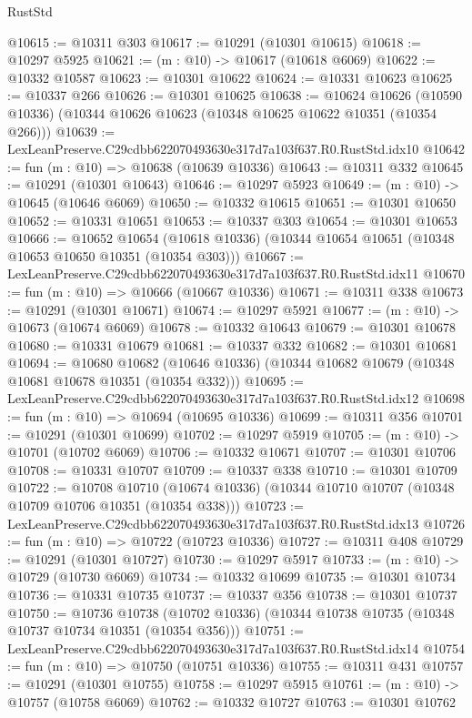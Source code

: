 \begin{lexlean}{RustStd}
\begin{coremodule}
@10615 := @10311 @303
@10617 := @10291 (@10301 @10615)
@10618 := @10297 @5925
@10621 := (m : @10) -> @10617 (@10618 @6069)
@10622 := @10332 @10587
@10623 := @10301 @10622
@10624 := @10331 @10623
@10625 := @10337 @266
@10626 := @10301 @10625
@10638 := @10624
    @10626
    (@10590 @10336)
    (@10344 @10626 @10623 (@10348 @10625 @10622 @10351 (@10354 @266)))
@10639 := LexLeanPreserve.C29cdbb622070493630e317d7a103f637.R0.RustStd.idx10
@10642 := fun (m : @10) => @10638 (@10639 @10336)
@10643 := @10311 @332
@10645 := @10291 (@10301 @10643)
@10646 := @10297 @5923
@10649 := (m : @10) -> @10645 (@10646 @6069)
@10650 := @10332 @10615
@10651 := @10301 @10650
@10652 := @10331 @10651
@10653 := @10337 @303
@10654 := @10301 @10653
@10666 := @10652
    @10654
    (@10618 @10336)
    (@10344 @10654 @10651 (@10348 @10653 @10650 @10351 (@10354 @303)))
@10667 := LexLeanPreserve.C29cdbb622070493630e317d7a103f637.R0.RustStd.idx11
@10670 := fun (m : @10) => @10666 (@10667 @10336)
@10671 := @10311 @338
@10673 := @10291 (@10301 @10671)
@10674 := @10297 @5921
@10677 := (m : @10) -> @10673 (@10674 @6069)
@10678 := @10332 @10643
@10679 := @10301 @10678
@10680 := @10331 @10679
@10681 := @10337 @332
@10682 := @10301 @10681
@10694 := @10680
    @10682
    (@10646 @10336)
    (@10344 @10682 @10679 (@10348 @10681 @10678 @10351 (@10354 @332)))
@10695 := LexLeanPreserve.C29cdbb622070493630e317d7a103f637.R0.RustStd.idx12
@10698 := fun (m : @10) => @10694 (@10695 @10336)
@10699 := @10311 @356
@10701 := @10291 (@10301 @10699)
@10702 := @10297 @5919
@10705 := (m : @10) -> @10701 (@10702 @6069)
@10706 := @10332 @10671
@10707 := @10301 @10706
@10708 := @10331 @10707
@10709 := @10337 @338
@10710 := @10301 @10709
@10722 := @10708
    @10710
    (@10674 @10336)
    (@10344 @10710 @10707 (@10348 @10709 @10706 @10351 (@10354 @338)))
@10723 := LexLeanPreserve.C29cdbb622070493630e317d7a103f637.R0.RustStd.idx13
@10726 := fun (m : @10) => @10722 (@10723 @10336)
@10727 := @10311 @408
@10729 := @10291 (@10301 @10727)
@10730 := @10297 @5917
@10733 := (m : @10) -> @10729 (@10730 @6069)
@10734 := @10332 @10699
@10735 := @10301 @10734
@10736 := @10331 @10735
@10737 := @10337 @356
@10738 := @10301 @10737
@10750 := @10736
    @10738
    (@10702 @10336)
    (@10344 @10738 @10735 (@10348 @10737 @10734 @10351 (@10354 @356)))
@10751 := LexLeanPreserve.C29cdbb622070493630e317d7a103f637.R0.RustStd.idx14
@10754 := fun (m : @10) => @10750 (@10751 @10336)
@10755 := @10311 @431
@10757 := @10291 (@10301 @10755)
@10758 := @10297 @5915
@10761 := (m : @10) -> @10757 (@10758 @6069)
@10762 := @10332 @10727
@10763 := @10301 @10762

\end{coremodule}
\end{lexlean}
